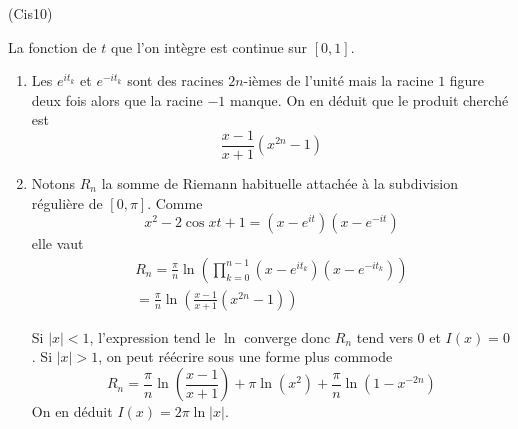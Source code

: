 \begin{tiny}(Cis10)\end{tiny} La fonction de $t$ que l'on intègre est continue sur $[0,1]$.
\begin{enumerate}
 \item Les $e^{it_k}$ et $e^{-it_k}$ sont des racines $2n$-ièmes de l'unité mais la racine $1$ figure deux fois alors que la racine $-1$ manque. On en déduit que le produit cherché est
\begin{displaymath}
 \frac{x-1}{x+1}(x^{2n}-1)
\end{displaymath}
\item Notons $R_n$ la somme de Riemann habituelle attachée à la subdivision régulière de $[0,\pi]$. Comme
\begin{displaymath}
 x^2-2\cos x t+ 1 = (x-e^{it})(x-e^{-it})
\end{displaymath}
elle vaut
\begin{multline*}
 R_n = \frac{\pi}{n}\ln \left(\prod_{k=0}^{n-1}(x-e^{it_k})(x-e^{-it_k}) \right) \\
= \frac{\pi}{n}\ln \left(\frac{x-1}{x+1}(x^{2n}-1)\right) 
\end{multline*}

Si $|x|<1$, l'expression tend le $\ln$ converge donc $R_n$ tend vers $0$ et $I(x)=0$.\newline
Si $|x|>1$, on peut réécrire sous une forme plus commode
\begin{displaymath}
 R_n = \frac{\pi}{n}\ln \left(\frac{x-1}{x+1}\right) + \pi\ln(x^2) +\frac{\pi}{n}\ln(1-x^{-2n})
\end{displaymath}
On en déduit $I(x)=2\pi \ln|x|$.
\end{enumerate}

